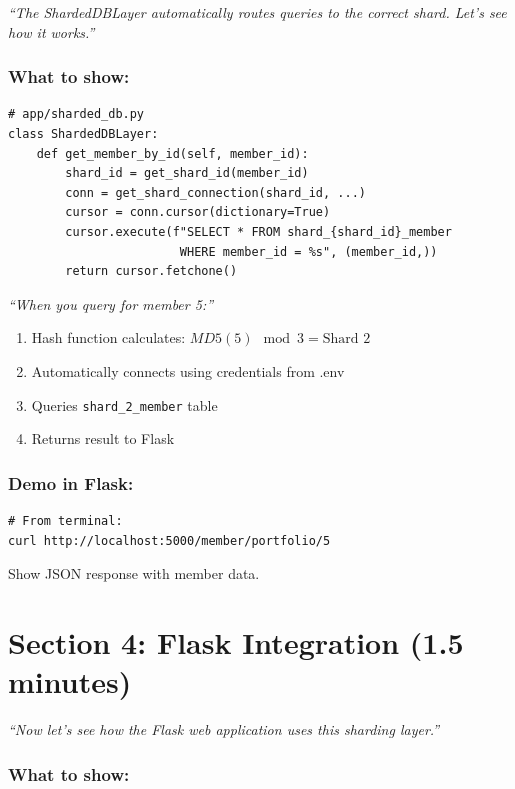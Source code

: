 \documentclass[12pt]{article}
\begin{document}
\textit{``The ShardedDBLayer automatically routes queries to the correct shard. Let's see how it works.''}

\subsubsection*{What to show:}

\begin{lstlisting}
# app/sharded_db.py
class ShardedDBLayer:
    def get_member_by_id(self, member_id):
        shard_id = get_shard_id(member_id)
        conn = get_shard_connection(shard_id, ...)
        cursor = conn.cursor(dictionary=True)
        cursor.execute(f"SELECT * FROM shard_{shard_id}_member 
                        WHERE member_id = %s", (member_id,))
        return cursor.fetchone()
\end{lstlisting}

\textit{``When you query for member 5:''}

\begin{enumerate}
    \item Hash function calculates: $MD5(5) \mod 3 = \text{Shard 2}$
    \item Automatically connects using credentials from .env
    \item Queries \texttt{shard\_2\_member} table
    \item Returns result to Flask
\end{enumerate}

\subsubsection*{Demo in Flask:}

\begin{lstlisting}
# From terminal:
curl http://localhost:5000/member/portfolio/5
\end{lstlisting}

Show JSON response with member data.

\section{Section 4: Flask Integration (1.5 minutes)}

\textit{``Now let's see how the Flask web application uses this sharding layer.''}

\subsubsection*{What to show:}
\end{document}
